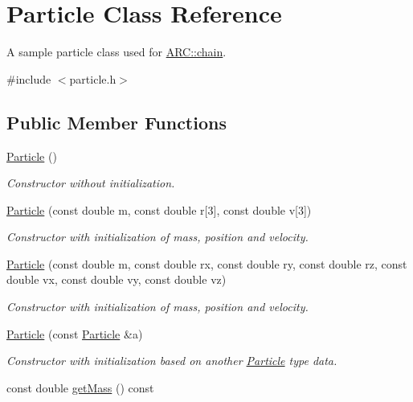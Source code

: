 \hypertarget{classParticle}{}\section{Particle Class Reference}
\label{classParticle}


A sample particle class used for \hyperlink{classARC_1_1chain}{A\+R\+C\+::chain}.  




{\ttfamily \#include $<$particle.\+h$>$}

\subsection*{Public Member Functions}
\begin{DoxyCompactItemize}
\item 
\hyperlink{classParticle_a40f4c7e248029d72e7714b7802d5e5e1}{Particle} ()
\begin{DoxyCompactList}\small\item\em Constructor without initialization. \end{DoxyCompactList}\item 
\hyperlink{classParticle_a5200252c69608a5cd6bd7be6ff03ae6c}{Particle} (const double m, const double r\mbox{[}3\mbox{]}, const double v\mbox{[}3\mbox{]})
\begin{DoxyCompactList}\small\item\em Constructor with initialization of mass, position and velocity. \end{DoxyCompactList}\item 
\hyperlink{classParticle_ac189ad370eb0a2c05869249d672a4f06}{Particle} (const double m, const double rx, const double ry, const double rz, const double vx, const double vy, const double vz)
\begin{DoxyCompactList}\small\item\em Constructor with initialization of mass, position and velocity. \end{DoxyCompactList}\item 
\hyperlink{classParticle_a602b45f0258d4e61d9c07f2c91d4f497}{Particle} (const \hyperlink{classParticle}{Particle} \&a)
\begin{DoxyCompactList}\small\item\em Constructor with initialization based on another \hyperlink{classParticle}{Particle} type data. \end{DoxyCompactList}\item 
const double \hyperlink{classParticle_a2576aff503f68e78ced91406512b1255}{get\+Mass} () const

\end{DoxyCompactItemize}
